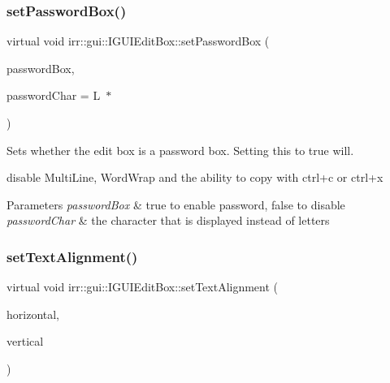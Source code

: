\subsubsection{\texorpdfstring{set\+Password\+Box()}{setPasswordBox()}}
{\footnotesize\ttfamily virtual void irr\+::gui\+::\+I\+G\+U\+I\+Edit\+Box\+::set\+Password\+Box (\begin{DoxyParamCaption}\item[{bool}]{password\+Box,  }\item[{wchar\+\_\+t}]{password\+Char = {\ttfamily L\textquotesingle{}~$\ast$\textquotesingle{}} }\end{DoxyParamCaption})\hspace{0.3cm}{\ttfamily [pure virtual]}}



Sets whether the edit box is a password box. Setting this to true will. 

disable Multi\+Line, Word\+Wrap and the ability to copy with ctrl+c or ctrl+x 
\begin{DoxyParams}{Parameters}
{\em password\+Box} & true to enable password, false to disable \\
\hline
{\em password\+Char} & the character that is displayed instead of letters \\
\hline
\end{DoxyParams}
\mbox{\label{classirr_1_1gui_1_1IGUIEditBox_ab1e2379940983f4ff874f5143f6d7244}} 
\subsubsection{\texorpdfstring{set\+Text\+Alignment()}{setTextAlignment()}}
{\footnotesize\ttfamily virtual void irr\+::gui\+::\+I\+G\+U\+I\+Edit\+Box\+::set\+Text\+Alignment (\begin{DoxyParamCaption}\item[{\hyperlink{namespaceirr_1_1gui_a19eb5fb40e67f108cb16aba922ddaa2d}{E\+G\+U\+I\+\_\+\+A\+L\+I\+G\+N\+M\+E\+NT}}]{horizontal,  }\item[{\hyperlink{namespaceirr_1_1gui_a19eb5fb40e67f108cb16aba922ddaa2d}{E\+G\+U\+I\+\_\+\+A\+L\+I\+G\+N\+M\+E\+NT}}]{vertical }\end{DoxyParamCaption})\hspace{0.3cm}{\ttfamily [pure virtual]}}



